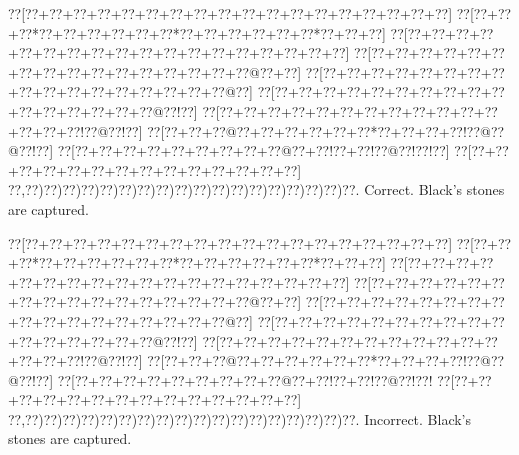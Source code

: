 \documentclass[a5paper]{article}
\begin{document}
\begin{center}
{\goo
\0??[\0??+\0??+\0??+\0??+\0??+\0??+\0??+\0??+\0??+\0??+\0??+\0??+\0??+\0??+\0??+\0??+\0??+\0??]
\0??[\0??+\0??+\0??*\0??+\0??+\0??+\0??+\0??+\0??*\0??+\0??+\0??+\0??+\0??+\0??*\0??+\0??+\0??]
\0??[\0??+\0??+\0??+\0??+\0??+\0??+\0??+\0??+\0??+\0??+\0??+\0??+\0??+\0??+\0??+\0??+\0??+\0??]
\0??[\0??+\0??+\0??+\0??+\0??+\0??+\0??+\0??+\0??+\0??+\0??+\0??+\0??+\0??+\0??+\0??@\0??+\0??]
\0??[\0??+\0??+\0??+\0??+\0??+\0??+\0??+\0??+\0??+\0??+\0??+\0??+\0??+\0??+\0??+\0??+\0??@\0??]
\0??[\0??+\0??+\0??+\0??+\0??+\0??+\0??+\0??+\0??+\0??+\0??+\0??+\0??+\0??+\0??+\0??@\0??!\0??]
\0??[\0??+\0??+\0??+\0??+\0??+\0??+\0??+\0??+\0??+\0??+\0??+\0??+\0??+\0??+\0??!\0??@\0??!\0??]
\0??[\0??+\0??+\0??@\0??+\0??+\0??+\0??+\0??+\0??*\0??+\0??+\0??+\0??!\0??@\0??@\0??!\0??]
\0??[\0??+\0??+\0??+\0??+\0??+\0??+\0??+\0??+\0??@\0??+\0??!\0??+\0??!\0??@\0??!\0??!\0??]
\0??[\0??+\0??+\0??+\0??+\0??+\0??+\0??+\0??+\0??+\0??+\0??+\0??+\0??+\0??]
\0??,\0??)\0??)\0??)\0??)\0??)\0??)\0??)\0??)\0??)\0??)\0??)\0??)\0??)\0??)\0??)\0??)\0??)\0??.
}
Correct. Black's stones are captured.

\end{center}
\begin{center}
{\goo
\0??[\0??+\0??+\0??+\0??+\0??+\0??+\0??+\0??+\0??+\0??+\0??+\0??+\0??+\0??+\0??+\0??+\0??+\0??]
\0??[\0??+\0??+\0??*\0??+\0??+\0??+\0??+\0??+\0??*\0??+\0??+\0??+\0??+\0??+\0??*\0??+\0??+\0??]
\0??[\0??+\0??+\0??+\0??+\0??+\0??+\0??+\0??+\0??+\0??+\0??+\0??+\0??+\0??+\0??+\0??+\0??+\0??]
\0??[\0??+\0??+\0??+\0??+\0??+\0??+\0??+\0??+\0??+\0??+\0??+\0??+\0??+\0??+\0??+\0??@\0??+\0??]
\0??[\0??+\0??+\0??+\0??+\0??+\0??+\0??+\0??+\0??+\0??+\0??+\0??+\0??+\0??+\0??+\0??+\0??@\0??]
\0??[\0??+\0??+\0??+\0??+\0??+\0??+\0??+\0??+\0??+\0??+\0??+\0??+\0??+\0??+\0??+\0??@\0??!\0??]
\0??[\0??+\0??+\0??+\0??+\0??+\0??+\0??+\0??+\0??+\0??+\0??+\0??+\0??+\0??+\0??!\0??@\0??!\0??]
\0??[\0??+\0??+\0??@\0??+\0??+\0??+\0??+\0??+\0??*\0??+\0??+\0??+\0??!\0??@\0??@\0??!\0??]
\0??[\0??+\0??+\0??+\0??+\0??+\0??+\0??+\0??+\0??@\0??+\0??!\0??+\0??!\0??@\0??!\0??!
\0??[\0??+\0??+\0??+\0??+\0??+\0??+\0??+\0??+\0??+\0??+\0??+\0??+\0??+\0??]
\0??,\0??)\0??)\0??)\0??)\0??)\0??)\0??)\0??)\0??)\0??)\0??)\0??)\0??)\0??)\0??)\0??)\0??)\0??.
}
Incorrect. Black's stones are captured.

\end{center}
\newpage
\end{document}
